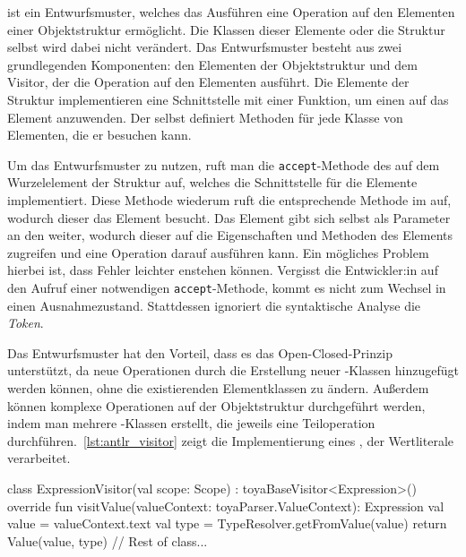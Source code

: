 \visitor ist ein Entwurfsmuster, welches das Ausführen eine Operation auf den Elementen einer Objektstruktur ermöglicht. Die Klassen dieser Elemente oder die Struktur selbst wird dabei nicht verändert. Das Entwurfsmuster besteht aus zwei grundlegenden Komponenten: den Elementen der Objektstruktur und dem Visitor, der die Operation auf den Elementen ausführt. Die Elemente der Struktur implementieren eine Schnittstelle mit einer Funktion, um einen \visitor auf das Element anzuwenden. Der \visitor selbst definiert Methoden für jede Klasse von Elementen, die er besuchen kann.

Um das Entwurfsmuster zu nutzen, ruft man die \texttt{accept}-Methode des \visitors auf dem Wurzelelement der Struktur auf, welches die Schnittstelle für die Elemente implementiert. Diese Methode wiederum ruft die entsprechende Methode im \visitor auf, wodurch dieser das Element besucht. Das Element gibt sich selbst als Parameter an den \visitor weiter, wodurch dieser auf die Eigenschaften und Methoden des Elements zugreifen und eine Operation darauf ausführen kann. Ein mögliches Problem hierbei ist, dass Fehler leichter enstehen können. Vergisst die Entwickler:in auf den Aufruf einer notwendigen \texttt{accept}-Methode, kommt es nicht zum Wechsel in einen Ausnahmezustand. Stattdessen ignoriert die syntaktische Analyse die \textit{Token}.

Das \visitor Entwurfsmuster hat den Vorteil, dass es das Open-Closed-Prinzip unterstützt, da neue Operationen durch die Erstellung neuer \visitor-Klassen hinzugefügt werden können, ohne die existierenden Elementklassen zu ändern. Außerdem können komplexe Operationen auf der Objektstruktur durchgeführt werden, indem man mehrere \visitor-Klassen erstellt, die jeweils eine Teiloperation durchführen.~\autoref{lst:antlr_visitor} zeigt die Implementierung eines \visitors, der Wertliterale verarbeitet.

\begin{ToyaCode}[numbers=none, caption={Implementierung eines \visitors für Wertliterale.}, label=lst:antlr_visitor]
class ExpressionVisitor(val scope: Scope) : toyaBaseVisitor<Expression>() {
    override fun visitValue(valueContext: toyaParser.ValueContext): Expression {
        val value = valueContext.text
        val type = TypeResolver.getFromValue(value)
        return Value(value, type)
    }
    // Rest of class...
}
\end{ToyaCode}